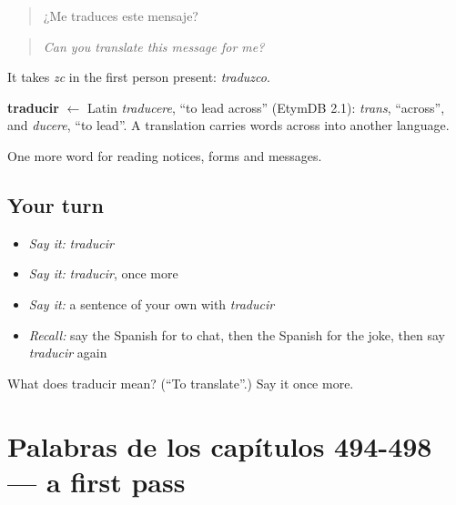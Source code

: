 \begin{quote}
¿Me traduces este mensaje?
\end{quote}

\begin{quote}
\emph{Can you translate this message for me?}
\end{quote}

It takes \emph{zc} in the first person present: \emph{traduzco}.

\begin{cousinweb}
\textbf{traducir} $\leftarrow$ Latin \emph{traducere}, \textquotedblleft{}to lead across\textquotedblright{} (EtymDB 2.1): \emph{trans}, \textquotedblleft{}across\textquotedblright{}, and \emph{ducere}, \textquotedblleft{}to lead\textquotedblright{}. A translation carries words across into another language.
\end{cousinweb}

\begin{grammarlens}[title={What you've built}]
One more word for reading notices, forms and messages.
\end{grammarlens}

\subsection*{Your turn}
\begin{itemize}
\raggedright
  \item \emph{Say it:} \emph{traducir}
  \item \emph{Say it:} \emph{traducir}, once more
  \item \emph{Say it:} a sentence of your own with \emph{traducir}
  \item \emph{Recall:} say the Spanish for to chat, then the Spanish for the joke, then say \emph{traducir} again
\end{itemize}

\begin{tcolorbox}[breakable,colback=teal!4,colframe=teal!35!black,title={Before you move on}]
What does traducir mean? (\textquotedblleft{}To translate\textquotedblright{}.) Say it once more.
\end{tcolorbox}
\section[(dialogue)]{Palabras de los capítulos 494-498 — a first pass}

\label{lesson:ES-R502-repaso-palabras-de-los-capitulos-494-498}



